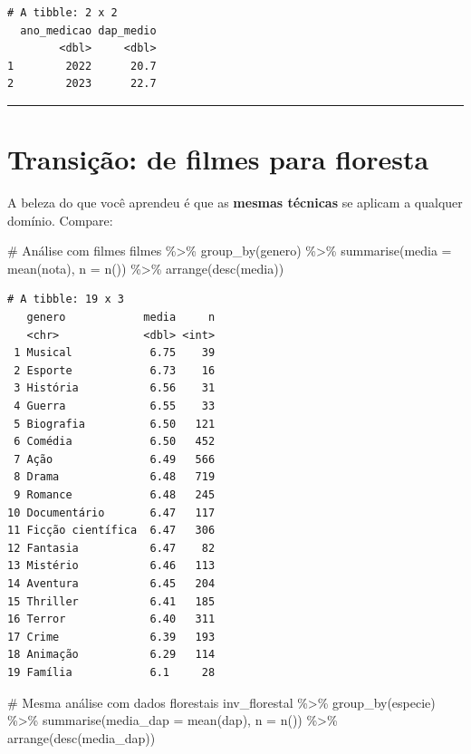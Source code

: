 \documentclass[
  letterpaper,
]{scrbook}
\newenvironment{Shaded}{\begin{snugshade}}{\end{snugshade}}
\newcommand{\AttributeTok}[1]{\textcolor[rgb]{0.40,0.45,0.13}{#1}}
\newcommand{\CommentTok}[1]{\textcolor[rgb]{0.37,0.37,0.37}{#1}}
\newcommand{\FunctionTok}[1]{\textcolor[rgb]{0.28,0.35,0.67}{#1}}
\newcommand{\NormalTok}[1]{\textcolor[rgb]{0.00,0.23,0.31}{#1}}
\newcommand{\SpecialCharTok}[1]{\textcolor[rgb]{0.37,0.37,0.37}{#1}}
\begin{document}
\begin{verbatim}
# A tibble: 2 x 2
  ano_medicao dap_medio
        <dbl>     <dbl>
1        2022      20.7
2        2023      22.7
\end{verbatim}

\begin{center}\rule{0.5\linewidth}{0.5pt}\end{center}

\section{Transição: de filmes para
floresta}\label{transiuxe7uxe3o-de-filmes-para-floresta}

A beleza do que você aprendeu é que as \textbf{mesmas técnicas} se
aplicam a qualquer domínio. Compare:

\begin{Shaded}
\begin{Highlighting}[]
\CommentTok{\# Análise com filmes}
\NormalTok{filmes }\SpecialCharTok{\%\textgreater{}\%} 
  \FunctionTok{group\_by}\NormalTok{(genero) }\SpecialCharTok{\%\textgreater{}\%} 
  \FunctionTok{summarise}\NormalTok{(}\AttributeTok{media =} \FunctionTok{mean}\NormalTok{(nota), }\AttributeTok{n =} \FunctionTok{n}\NormalTok{()) }\SpecialCharTok{\%\textgreater{}\%} 
  \FunctionTok{arrange}\NormalTok{(}\FunctionTok{desc}\NormalTok{(media))}
\end{Highlighting}
\end{Shaded}

\begin{verbatim}
# A tibble: 19 x 3
   genero            media     n
   <chr>             <dbl> <int>
 1 Musical            6.75    39
 2 Esporte            6.73    16
 3 História           6.56    31
 4 Guerra             6.55    33
 5 Biografia          6.50   121
 6 Comédia            6.50   452
 7 Ação               6.49   566
 8 Drama              6.48   719
 9 Romance            6.48   245
10 Documentário       6.47   117
11 Ficção científica  6.47   306
12 Fantasia           6.47    82
13 Mistério           6.46   113
14 Aventura           6.45   204
15 Thriller           6.41   185
16 Terror             6.40   311
17 Crime              6.39   193
18 Animação           6.29   114
19 Família            6.1     28
\end{verbatim}

\begin{Shaded}
\begin{Highlighting}[]
\CommentTok{\# Mesma análise com dados florestais}
\NormalTok{inv\_florestal }\SpecialCharTok{\%\textgreater{}\%} 
  \FunctionTok{group\_by}\NormalTok{(especie) }\SpecialCharTok{\%\textgreater{}\%} 
  \FunctionTok{summarise}\NormalTok{(}\AttributeTok{media\_dap =} \FunctionTok{mean}\NormalTok{(dap), }\AttributeTok{n =} \FunctionTok{n}\NormalTok{()) }\SpecialCharTok{\%\textgreater{}\%} 
  \FunctionTok{arrange}\NormalTok{(}\FunctionTok{desc}\NormalTok{(media\_dap))}
\end{Highlighting}
\end{Shaded}
\end{document}
